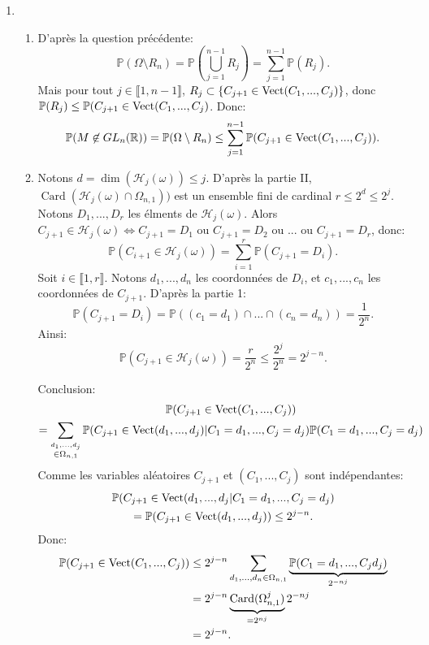 \begin{enumerate}
 
 \item \begin{enumerate}
            \item D'après la question précédente:
            \[ \mathbb{P}(\Omega \setminus R_{n}) = \mathbb{P}\left ( \bigcup_{j=1}^{n-1}R_{j}\right ) = \sum_{j=1}^{n-1}\mathbb{P}(R_{j}).\]
            Mais pour tout $j\in \llbracket 1, n-1\rrbracket$, $R_{j}\subset  \{ C_{j+1} \in \operatorname{Vect}(C_{1}, ..., C_{j}) \}$, donc $\mathbb{P}(R_{j}) \leq \mathbb{P}(C_{j+1}\in \operatorname{Vect}(C_{1}, ..., C_{j})$. 
            Donc:
            \[ \mathbb{P}(M \not \in GL_{n}(\mathbb{R})) = \mathbb{P}(\Omega \setminus R_{n}) \leq \sum_{j=1}^{n-1}\mathbb{P}(C_{j+1}\in \operatorname{Vect}(C_{1}, ..., C_{j})).\]
            \item Notons $d = \dim(\mathcal{H}_{j}(\omega)) \leq j$. D'après la partie II, $\operatorname{Card}(\mathcal{H}_{j}(\omega)\cap \Omega_{n,1}))$ est un ensemble fini de cardinal $r\leq 2^{d} \leq 2^{j}$. Notons $D_{1}, ..., D_{r}$ les
            élments de $\mathcal{H}_{j}(\omega)$. Alors $C_{j+1}\in \mathcal{H}_{j}(\omega) \Longleftrightarrow  C_{j+1} = D_{1}$ ou $C_{j+1} = D_{2}$ ou ... ou $C_{j+1} = D_{r}$, donc:
            \[ \mathbb{P}(C_{i+1} \in \mathcal{H}_{j}(\omega)) = \sum_{i=1}^{r}\mathbb{P}(C_{j+1} = D_{i}).\]
            Soit $i\in \llbracket 1, r\rrbracket$. Notons $d_{1}, ..., d_{n}$ les coordonnées de $D_{i}$, et $c_{1}, ..., c_{n}$ les coordonnées de $C_{j+1}$. D'après la partie 1:
            \[\mathbb{P}(C_{j+1} = D_{i}) = \mathbb{P}((c_{1} = d_{1})\cap ... \cap (c_{n} = d_{n})) = \frac{1}{2^{n}}.\]
            Ainsi:
            \[ \mathbb{P}(C_{j+1}\in \mathcal{H}_{j}(\omega)) = \frac{r}{2^{n}} \leq \frac{2^{j}}{2^{n}} = 2^{j-n}.\]
            
            Conclusion:
            \begin{multline*}
              \mathbb{P}(C_{j+1}\in \operatorname{Vect}(C_{1}, ..., C_{j})) \\
              = \sum_{\stackrel{d_{1}, ..., d_{j}}{\in \Omega_{n,1}}}\mathbb{P}(C_{j+1}\in \operatorname{Vect}(d_{1}, ..., d_{j})| C_{1} = d_{1}, ..., C_{j} = d_{j})\mathbb{P}(C_{1} = d_{1}, ..., C_{j} = d_{j})
            \end{multline*}
            Comme les variables aléatoires $C_{j+1}$ et $(C_{1}, ..., C_{j})$ sont indépendantes:
            \begin{multline*}
            \mathbb{P}(C_{j+1}\in \operatorname{Vect}(d_{1}, ..., d_{j}|C_{1} = d_{1}, ..., C_{j} = d_{j}) \\
            = \mathbb{P}(C_{j+1}\in \operatorname{Vect}(d_{1}, ..., d_{j})) \leq 2^{j-n}.             
            \end{multline*}
            Donc:
            \begin{align}
             \mathbb{P}(C_{j+1}\in \operatorname{Vect}(C_{1}, ..., C_{j})) & \leq 2^{j-n}\sum_{d_{1}, ..., d_{n}\in \Omega_{n,1}}\underbrace{\mathbb{P}(C_{1} = d_{1}, ..., C_{j} d_{j})}_{2^{-nj}} \notag \\
             & = 2^{j-n} \underbrace{\operatorname{Card}(\Omega_{n,1}^{j})}_{ = 2^{nj}}2^{-nj} \notag \\
             & = 2^{j-n}. \notag
            \end{align}
            

\end{enumerate}
\end{enumerate}
